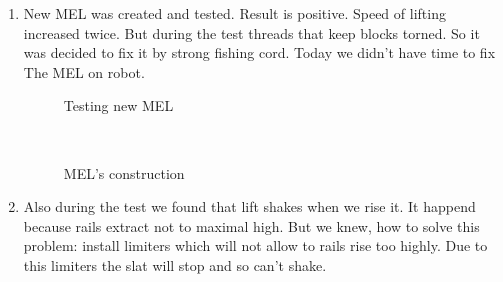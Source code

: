 \begin{enumerate}
\begin{enumerate}
		\item New MEL was created and tested. Result is positive. Speed of lifting increased twice. But during the test threads that keep blocks torned. So it was decided to fix it by strong fishing cord. Today we didn't have time to fix The MEL on robot.
		\begin{figure}[H]
			\begin{minipage}[h]{0.47\linewidth}
				\caption{Testing new MEL}  
			\end{minipage}
			\hfill
			\begin{minipage}[h]{0.47\linewidth}
				\caption{MEL's construction}
			\end{minipage}
		\end{figure}
		
		\item Also during the test we found that lift shakes when we rise it. It happend because rails extract not to maximal high. But we knew, how to solve this problem: install limiters which will not allow to rails rise too highly. Due to this limiters the slat will stop and so can't shake.
		

\end{enumerate}
\end{enumerate}

